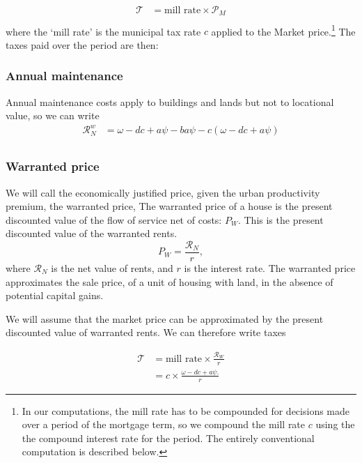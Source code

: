 \begin{align*}
\mathcal{T} &= \text{mill rate} \times \mathcal{P}_M \\
\end{align*}
where the `\gls{mill rate}' is the municipal tax rate $c$ applied to the Market price.\footnote{In our computations, the mill rate  has to be compounded for decisions made over a period of the mortgage term, so we compound the mill rate $c$ using the the \gls{compound interest rate} for the period. The entirely conventional  computation is described below.} The taxes paid over the period are then:

\subsubsection{Annual maintenance}
Annual maintenance costs apply to buildings and lands but not to locational value,
so we can write
 \begin{align}
\mathcal{R}_N^w &= \omega - {dc}  + a\psi -   ba\psi - c(\omega-{dc}+a\psi) \\
\end{align}

\subsubsection{Warranted price}\label{sssec-warranted-price}

We will call the economically justified price, given the urban productivity premium, the \gls{warranted price}, 
The \gls{warranted price} of a house is the present discounted value of the flow of service net of costs: $P_W$. This is the present discounted value of the warranted rents.
\begin{equation}
  P_W=\frac{\mathcal{R}_N}{r},  
\label{eqn-price-warranted}
\end{equation}
where $\mathcal{R}_N$ is the net value of rents, and $r$ is the interest rate.  The warranted price approximates the sale price, of a unit of housing with land, in the absence of potential capital gains. 

We will assume that the market price can be approximated by the present discounted value of warranted  rents.  We can therefore write taxes

\begin{align*}
\mathcal{T} &= \text{mill rate} \times \frac{\mathcal{R}_W}{r} \\
&= c \times \frac{\omega- {dc} + a\psi.}{r}
\end{align*}


